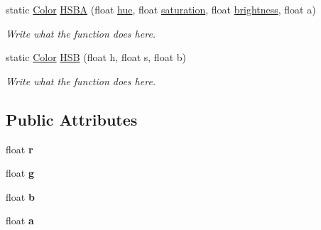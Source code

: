 \begin{DoxyCompactItemize}
static \hyperlink{structColor}{Color} \hyperlink{structColor_a5562bd3132e09dcf0271b679a7aeb6de}{H\+S\+B\+A} (float \hyperlink{structColor_a183b93e13e713514a4bee5fdbd8a5a9b}{hue}, float \hyperlink{structColor_a225af5fdfba5d0d6d4d660a1f4c9a509}{saturation}, float \hyperlink{structColor_a7eb1a828a3e3c6a3c5e5843a0413f485}{brightness}, float a)
\begin{DoxyCompactList}\small\item\em Write what the function does here. \end{DoxyCompactList}\item 
static \hyperlink{structColor}{Color} \hyperlink{structColor_aaa9f14f33ed6609e4891a0247150ae52}{H\+S\+B} (float h, float s, float b)
\begin{DoxyCompactList}\small\item\em Write what the function does here. \end{DoxyCompactList}\end{DoxyCompactItemize}
\subsection*{Public Attributes}
\begin{DoxyCompactItemize}
\item 
\hypertarget{structColor_a3958a556b47d2de3dd45c75aac833c20}{float {\bfseries r}}\label{structColor_a3958a556b47d2de3dd45c75aac833c20}

\item 
\hypertarget{structColor_a5defbb21620e480e556181772d665f34}{float {\bfseries g}}\label{structColor_a5defbb21620e480e556181772d665f34}

\item 
\hypertarget{structColor_a33e482be18d6ea31d2b403bee13683b7}{float {\bfseries b}}\label{structColor_a33e482be18d6ea31d2b403bee13683b7}

\item 
\hypertarget{structColor_a98047aee65fc3d825f88a76da728fd27}{float {\bfseries a}}\label{structColor_a98047aee65fc3d825f88a76da728fd27}

\end{DoxyCompactItemize}
